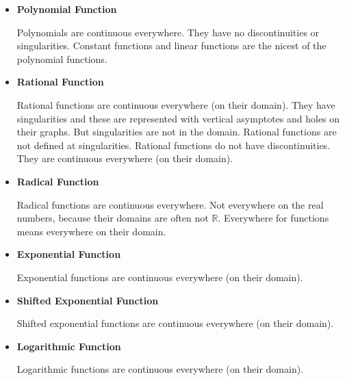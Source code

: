 \documentclass{ximera}
\begin{document}
\begin{itemize} 

\item \textbf{\textcolor{blue!55!black}{Polynomial Function}} 


Polynomials are continuous everywhere. They have no discontinuities or singularities. Constant functions and linear functions are the nicest of the polynomial functions.





\item \textbf{\textcolor{blue!55!black}{Rational Function}} 

Rational functions are continuous everywhere (on their domain).  They have singularities and these are represented with vertical asymptotes and holes on their graphs.  But singularities are not in the domain.  Rational functions are not defined at singularities. Rational functions do not have discontinuities.  They are continuous everywhere (on their domain). 




\item \textbf{\textcolor{blue!55!black}{Radical Function}} 

Radical functions are continuous everywhere.  Not everywhere on the real numbers, because their domains are often not $\mathbb{R}$. Everywhere for functions means everywhere on their domain.






\item \textbf{\textcolor{blue!55!black}{Exponential Function}} 

Exponential functions are continuous everywhere (on their domain).




\item \textbf{\textcolor{blue!55!black}{Shifted Exponential Function}} 

Shifted exponential functions are continuous everywhere (on their domain).




\item \textbf{\textcolor{blue!55!black}{Logarithmic Function}} 

Logarithmic functions are continuous everywhere (on their domain).










\end{itemize}
\end{document}
